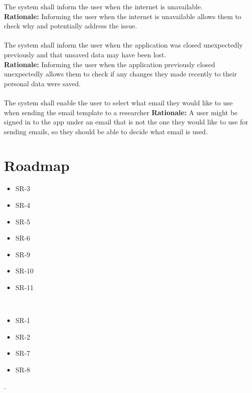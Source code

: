 \documentclass{article}
\begin{document}
The system shall inform the user when the internet is unavailable. \\
\textbf{Rationale:}
Informing the user when the internet is unavailable allows them to check why and potentially address the issue. \\~\\

The system shall inform the user when the application was closed unexpectedly previously and that unsaved data may have been lost. \\
\textbf{Rationale:}
Informing the user when the application previously closed unexpectedly allows them to check if any changes they made recently to their personal data were saved. \\~\\

The system shall enable the user to select what email they would like to use when sending the email template to a researcher
\textbf{Rationale:}
A user might be signed in to the app under an email that is not the one they would like to use for sending emails, so they should be
able to decide what email is used.

\section{Roadmap}

\begin{itemize}
  \item SR-3
  \item SR-4
  \item SR-5
  \item SR-6
  \item SR-9
  \item SR-10
  \item SR-11
\end{itemize}

\\

\begin{itemize}
  \item SR-1
  \item SR-2
  \item SR-7
  \item SR-8
\end{itemize}

.
\end{document}
